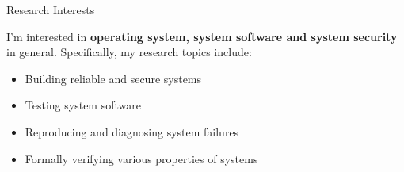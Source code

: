 \begin{rSection}{Research Interests}
\newcommand{\eg}{\textit{e}.\textit{g}.\xspace}

I'm interested in \textbf{operating system, system software and
  system security} in general. Specifically, my research topics
include:

\begin{itemize}[leftmargin=*,itemsep=-5pt]
\item{Building reliable and secure systems}
\item{Testing system software}
\item{Reproducing and diagnosing system failures}
\item{Formally verifying various properties of systems}
\end{itemize}


\end{rSection}
